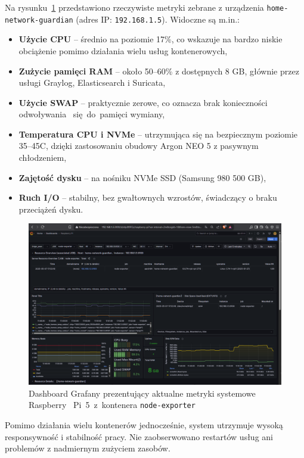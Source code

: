 \documentclass[
    left=2.5cm,         %
    right=2.5cm,        %
    top=2.5cm,          %
    bottom=3cm,         %
    bindingoffset=6mm,  %
    nohyphenation=true %
]{eiti/eiti-thesis} %
\begin{document}
Na rysunku~\ref{fig:grafana} przedstawiono rzeczywiste metryki zebrane z urządzenia \texttt{home-network-guardian} (adres IP: \texttt{192.168.1.5}). Widoczne są m.in.:
\begin{itemize}
    \item \textbf{Użycie CPU} – średnio na poziomie 17\%, co wskazuje na bardzo niskie obciążenie pomimo działania wielu usług kontenerowych,
    \item \textbf{Zużycie pamięci RAM} – około 50–60\% z dostępnych 8 GB, głównie przez usługi Graylog, Elasticsearch i Suricata,
    \item \textbf{Użycie SWAP} – praktycznie zerowe, co oznacza brak konieczności odwoływania ~się~do~pamięci wymiany,
    \item \textbf{Temperatura CPU i NVMe} – utrzymująca się na bezpiecznym poziomie 35–45\textdegree C, dzięki zastosowaniu obudowy Argon NEO 5 z pasywnym chłodzeniem,
    \item \textbf{Zajętość dysku} – na nośniku NVMe SSD (Samsung 980 500 GB),
    \item \textbf{Ruch I/O} – stabilny, bez gwałtownych wzrostów, świadczący o braku przeciążeń dysku.
\end{itemize}

\begin{figure}[H]
    \centering
    \includegraphics[width=\textwidth]{grafana.png}
    \caption{Dashboard Grafany prezentujący aktualne metryki systemowe Raspberry ~Pi~5~z~kontenera \texttt{node-exporter}}
    \label{fig:grafana}
\end{figure}

Pomimo działania wielu kontenerów jednocześnie, system utrzymuje wysoką responsywność i stabilność pracy. Nie zaobserwowano restartów usług ani problemów z nadmiernym zużyciem zasobów.
\end{document}
